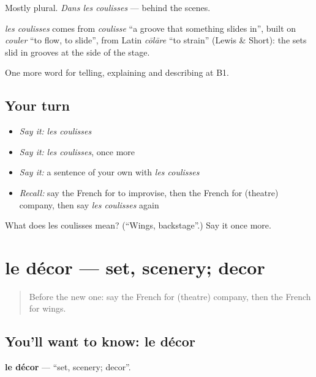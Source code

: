 Mostly plural. \emph{Dans les coulisses} — behind the scenes.

\begin{cousinweb}
\emph{les coulisses} comes from \emph{coulisse} \textquotedblleft{}a groove that something slides in\textquotedblright{}, built on \emph{couler} \textquotedblleft{}to flow, to slide\textquotedblright{}, from Latin \emph{cōlāre} \textquotedblleft{}to strain\textquotedblright{} (Lewis \& Short): the sets slid in grooves at the side of the stage.
\end{cousinweb}

\begin{grammarlens}[title={What you've built}]
One more word for telling, explaining and describing at B1.
\end{grammarlens}

\subsection*{Your turn}
\begin{itemize}
\raggedright
  \item \emph{Say it:} \emph{les coulisses}
  \item \emph{Say it:} \emph{les coulisses}, once more
  \item \emph{Say it:} a sentence of your own with \emph{les coulisses}
  \item \emph{Recall:} say the French for to improvise, then the French for (theatre) company, then say \emph{les coulisses} again
\end{itemize}

\begin{tcolorbox}[breakable,colback=teal!4,colframe=teal!35!black,title={Before you move on}]
What does les coulisses mean? (\textquotedblleft{}Wings, backstage\textquotedblright{}.) Say it once more.
\end{tcolorbox}
\section[le décor]{le décor — set, scenery; decor}

\label{lesson:FR-C514-decor}



\begin{quote}
Before the new one: say the French for (theatre) company, then the French for wings.
\end{quote}

\subsection*{You'll want to know: le décor}
\textbf{le décor} — \textquotedblleft{}set, scenery; decor\textquotedblright{}.

